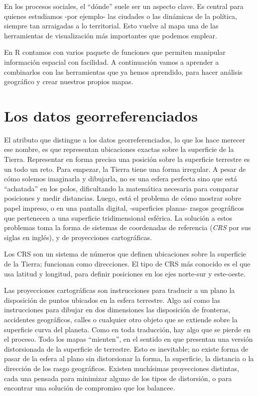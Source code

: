 \documentclass[]{book}
\begin{document}
En los procesos sociales, el ``dónde'' suele ser un aspecto clave. Es
central para quienes estudiamos -por ejemplo- las ciudades o las
dinámicas de la política, siempre tan arraigadas a lo territorial. Esto
vuelve al mapa una de las herramientas de visualización más importantes
que podemos emplear.

En R contamos con varios paquete de funciones que permiten manipular
información espacial con facilidad. A continuación vamos a aprender a
combinarlos con las herramientas que ya hemos aprendido, para hacer
análisis geográfico y crear nuestros propios mapas.

\section{Los datos georreferenciados}\label{los-datos-georreferenciados}

El atributo que distingue a los datos georreferenciados, lo que los hace
merecer ese nombre, es que representan ubicaciones exactas sobre la
superficie de la Tierra. Representar en forma precisa una posición sobre
la superficie terrestre es un todo un reto. Para empezar, la Tierra
tiene una forma irregular. A pesar de cómo solemos imaginarla y
dibujarla, no es una esfera perfecta sino que está ``achatada'' en los
polos, dificultando la matemática necesaria para comparar posiciones y
medir distancias. Luego, está el problema de cómo mostrar sobre papel
impreso, o en una pantalla digital, -superficies planas- rasgos
geográficos que pertenecen a una superficie tridimensional esférica. La
solución a estos problemas toma la forma de sistemas de coordenadas de
referencia (\emph{CRS} por sus siglas en inglés), y de proyecciones
cartográficas.

Los CRS son un sistema de números que definen ubicaciones sobre la
superficie de la Tierra; funcionan como direcciones. El tipo de CRS más
conocido es el que usa latitud y longitud, para definir posiciones en
los ejes norte-sur y este-oeste.

Las proyecciones cartográficas son instrucciones para traducir a un
plano la disposición de puntos ubicados en la esfera terrestre. Algo así
como las instrucciones para dibujar en dos dimensiones las disposición
de fronteras, accidentes geográficos, calles o cualquier otro objeto que
se extiende sobre la superficie curva del planeta. Como en toda
traducción, hay algo que se pierde en el proceso. Todo los mapas
``mienten'', en el sentido en que presentan una versión distorsionada de
la superficie de terrestre. Esto es inevitable; no existe forma de pasar
de la esfera al plano sin distorsionar la forma, la superficie, la
distancia o la dirección de los rasgo geográficos. Existen muchísimas
proyecciones distintas, cada una pensada para minimizar alguno de los
tipos de distorsión, o para encontrar una solución de compromiso que los
balancee.
\end{document}

